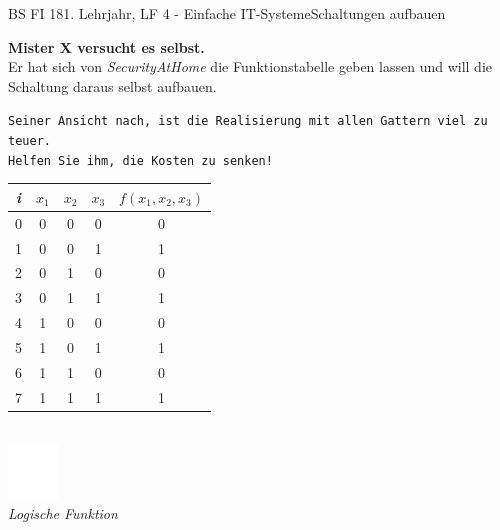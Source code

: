 \documentclass[oneside,openany,headings=optiontotoc,11pt,numbers=noenddot]{scrreprt}
\begin{document}
	\begin{worksheet}{BS FI 18}{1. Lehrjahr, LF 4 - Einfache IT-Systeme}{Schaltungen aufbauen}
		\begin{framed}
			\noindent
			\begin{minipage}{0.58\textwidth}
				\textbf{Mister X versucht es selbst.}\\
				Er hat sich von \textit{SecurityAtHome} die Funktionstabelle geben lassen und will die Schaltung daraus selbst aufbauen.
				\par
				\begin{addmargin}[0.75cm]{0cm}
					\texttt{Seiner Ansicht nach, ist die Realisierung mit allen Gattern viel zu teuer.\\
						Helfen Sie ihm, die Kosten zu senken!}\\
				\end{addmargin}
			\end{minipage}
			\hfill
			\begin{minipage}{0.4\textwidth}
				\begin{tabular}{|c||ccc||c|}
					\hline
					\textit{i} & \(x_1\) & \(x_2\) & \(x_3\) & \(f(x_1,x_2,x_3)\)\\
					\hline
					0 & 0 & 0 & 0 & 0\\
					\hline
					1 & 0 & 0 & 1 & 1\\
					\hline
					2 & 0 & 1 & 0 & 0\\
					\hline
					3 & 0 & 1 & 1 & 1\\
					\hline
					4 & 1 & 0 & 0 & 0\\
					\hline
					5 & 1 & 0 & 1 & 1\\
					\hline
					6 & 1 & 1 & 0 & 0\\
					\hline
					7 & 1 & 1 & 1 & 1\\
					\hline
				\end{tabular}
			\end{minipage}
		\end{framed}
		\begin{framed}
			\noindent
			\tiny{\textit{\color{codegray}{Minterme}}}\\
			\normalsize
			\includegraphics[width=0.1\textwidth]{../../empty.jpg}\\
			\noindent
			\tiny{\textit{\color{codegray}Logische Funktion}}\\

\end{framed}
\end{worksheet}
\end{document}
